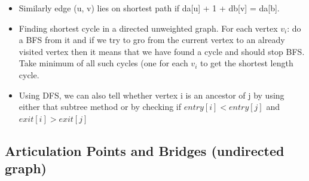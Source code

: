 \documentclass[8pt, a4paper, oneside, twocolumn]{extarticle}
\begin{document}
\begin{itemize}
    \item Similarly edge (u, v) lies on shortest path if da[u] + 1 + db[v] = da[b].
    \item Finding shortest cycle in a directed unweighted graph. For each vertex $v_i$: do a BFS from it and if we try to gro from the current vertex to an already visited vertex then it means that we have found a cycle and should stop BFS.
    \\Take minimum of all such cycles (one for each $v_i$ to get the shortest length cycle.
    \item Using DFS, we can also tell whether vertex i is an ancestor of j by using either that subtree method or by checking if $entry[i] < entry[j]$ and $exit[i] > exit[j]$
\end{itemize}
\subsection{Articulation Points and Bridges (undirected graph)}
\end{document}
